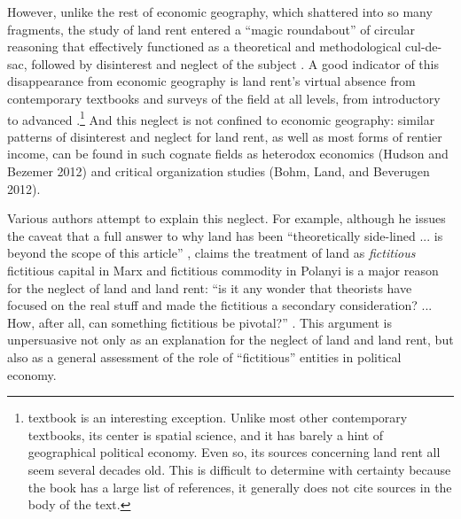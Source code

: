 However, unlike the rest of economic geography, which shattered into
so many fragments, the study of land rent entered a ``magic roundabout''
of circular reasoning \citep{kerr1996thetheory} that effectively
functioned as a theoretical and methodological cul-de-sac, followed
by disinterest and neglect of the subject \citep{park2014landrent,ward2016theshitty,christophers2016forreal}.
A good indicator of this disappearance from economic geography is
land rent's virtual absence from contemporary textbooks and surveys
of the field at all levels, from introductory to advanced \citep{mackinnon2011introduction,wood2012economic,barnes2012thewileyblackwell}.\footnote{\citet{anderson2012economic} textbook is an interesting exception.
Unlike most other contemporary textbooks, its center is spatial science,
and it has barely a hint of geographical political economy. Even so,
its sources concerning land rent all seem several decades old. This
is difficult to determine with certainty because the book has a large
list of references, it generally does not cite sources in the body
of the text. } And this neglect is not confined to economic geography: similar patterns
of disinterest and neglect for land rent, as well as most forms of
rentier income, can be found in such cognate fields as heterodox economics
(Hudson and Bezemer 2012) and critical organization studies (Bohm,
Land, and Beverugen 2012).

Various authors attempt to explain this neglect. For example, although
he issues the caveat that a full answer to why land has been ``theoretically
side-lined ... is beyond the scope of this article'' \citep[136]{christophers2016forreal},
\citet{christophers2016forreal} claims the treatment of land as \emph{fictitious
}\textendash{} fictitious capital in Marx and fictitious commodity
in Polanyi \textendash{} is a major reason for the neglect of land
and land rent: ``is it any wonder that theorists have focused on
the real stuff and made the fictitious a secondary consideration?
... How, after all, can something fictitious be pivotal?'' \citep[137, original emphasis]{christophers2016forreal}.
This argument is unpersuasive not only as an explanation for the neglect
of land and land rent, but also as a general assessment of the role
of ``fictitious'' entities in political economy.

